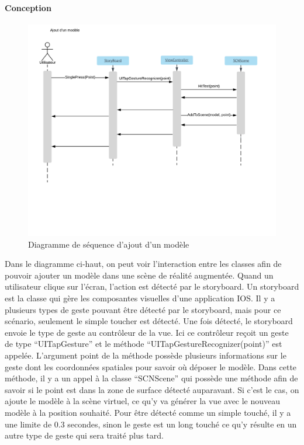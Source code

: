 \documentclass[rapport.tex]{subfiles}
\begin{document}
\paragraph*{Conception}
\begin{figure}[H]
    \includegraphics[width=\textwidth]{DSS_AjoutModels.png}
\centering
    \caption{Diagramme de séquence d'ajout d'un modèle}
\end{figure}
Dans le diagramme ci-haut, on peut voir l'interaction entre les classes afin de pouvoir ajouter un modèle dans une scène de réalité augmentée. Quand un utilisateur clique sur l’écran, l’action est détecté par le storyboard. Un storyboard est la classe qui gère les composantes visuelles d’une application IOS. Il y a plusieurs types de geste pouvant être détecté par le storyboard, mais pour ce scénario, seulement le simple toucher est détecté. Une fois détecté, le storyboard envoie le type de geste au contrôleur de la vue. Ici ce contrôleur reçoit un geste de type “UITapGesture” et le méthode “UITapGestureRecognizer(point)” est appelée. L’argument point de la méthode possède plusieurs informations sur le geste dont les coordonnées spatiales pour savoir où déposer le modèle. Dans cette méthode, il y a un appel à la classe “SCNScene” qui possède une méthode afin de savoir si le point est dans la zone de surface détecté auparavant. Si c’est le cas, on ajoute le modèle à la scène virtuel, ce qu’y va générer la vue avec le nouveau modèle à la position souhaité. Pour être détecté comme un simple touché, il y a une limite de 0.3 secondes, sinon le geste est un long touché ce qu’y résulte en un autre type de geste qui sera traité plus tard.
\end{document}
